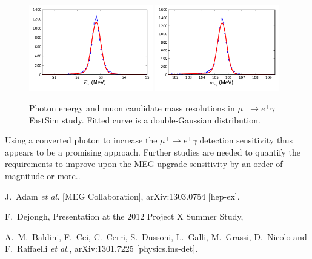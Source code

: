 \begin{figure}[htbp]
   \centering
   \includegraphics[width=0.48\textwidth]{ChargedLeptons/Figures/muegamma-gamma-resolution.pdf} 
   \includegraphics[width=0.48\textwidth]{ChargedLeptons/Figures/muegamma-mumass-resolution.pdf} 
   \caption{Photon energy and muon candidate mass resolutions in 
   $\mu^+\to e^+\gamma$ FastSim study. Fitted curve is a double-Gaussian 
   distribution.}
   \label{fig:muegamma-resolutions}
\end{figure}

Using a converted photon to increase the $\mu^+\to e^+\gamma$ detection sensitivity
thus appears to be a promising approach. Further studies are needed to quantify the requirements to improve upon the MEG upgrade sensitivity by an order of magnitude or more.. 



\begin{thebibliography}{99}

  J.~Adam {\it et al.}  [MEG Collaboration],
  arXiv:1303.0754 [hep-ex].
  
F.~Dejongh, Presentation at the 2012 Project X Summer Study, \hfill{}

  A.~M.~Baldini, F.~Cei, C.~Cerri, S.~Dussoni, L.~Galli, M.~Grassi, D.~Nicolo and F.~Raffaelli {\it et al.},
  arXiv:1301.7225 [physics.ins-det].

\end{thebibliography}
